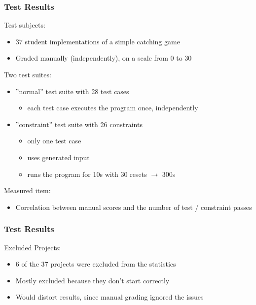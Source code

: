 \begin{frame}
\end{frame}

\begin{frame}
\end{frame}

\begin{frame}\frametitle{Test Results}
    Test subjects:
    \begin{itemize}
        \item \textcolor{upfim}{37 student implementations} of a simple catching game
        \item Graded manually (independently), on a scale from 0 to 30
    \end{itemize}

    \bigskip

    Two test suites:
    \begin{itemize}
        \item \textcolor{upfim}{''normal'' test suite} with 28 test cases
            \begin{itemize}
                \item each test case executes the program once, independently
            \end{itemize}
        \item \textcolor{upfim}{''constraint'' test suite} with 26 constraints
            \begin{itemize}
                \item only one test case
                \item uses generated input
                \item runs the program for 10s with 30 resets $\rightarrow$ 300s
            \end{itemize}
    \end{itemize}

    \bigskip

    Measured item:
    \begin{itemize}
        \item Correlation between manual scores and the number of test / constraint passes
    \end{itemize}
\end{frame}

\begin{frame}\frametitle{Test Results}
    Excluded Projects:
    \begin{itemize}
        \item 6 of the 37 projects were excluded from the statistics
        \item Mostly excluded because they don't start correctly
        \item Would distort results, since manual grading ignored the issues
    \end{itemize}

\end{frame}

